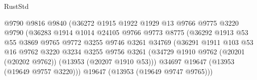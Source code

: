 \begin{lexlean}{RustStd}
\begin{coremodule}
                                      @9790
                                      @9816
                                      @9840
                                      (@36272
                                        @1915
                                        @1922
                                        @1929
                                        @13
                                        @9766
                                        @9775
                                        @3220
                                        @9790
                                        (@36283
                                          @1914
                                          @1014
                                          @24105
                                          @9766
                                          @9773
                                          @8775
                                          (@36292
                                            @1913
                                            @53
                                            @55
                                            @3869
                                            @9765
                                            @9772
                                            @3255
                                            @9746
                                            @3261
                                            @34769
                                            (@36291
                                              @1911
                                              @103
                                              @53
                                              @16
                                              @9762
                                              @3220
                                              @3234
                                              @3255
                                              @9756
                                              @3261
                                              (@34729
                                                @1910
                                                @9762
                                                (@20201 (@20202 @9762))
                                                (@13953 (@20207 @1910 @53)))
                                              @34697
                                              @19647
                                              (@13953 (@19649 @9757 @3220)))
                                            @19647
                                            (@13953 (@19649 @9747 @9765)))

\end{coremodule}
\end{lexlean}
